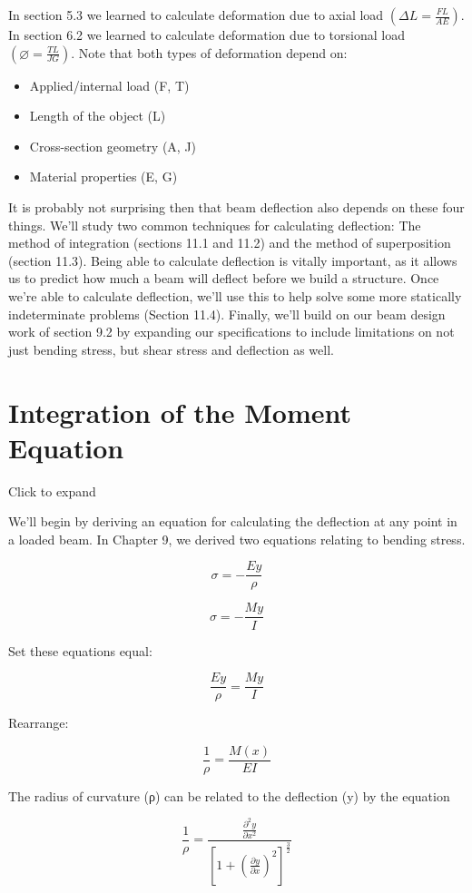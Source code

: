 \documentclass[
  letterpaper,
  DIV=11,
  numbers=noendperiod]{scrreprt}
\begin{document}
In section 5.3 we learned to calculate deformation due to axial load
\(\left(\Delta L=\frac{F L}{A E}\right)\). In section 6.2 we learned to
calculate deformation due to torsional load
\(\left(\varnothing=\frac{T L}{J G}\right)\). Note that both types of
deformation depend on:

\begin{itemize}
\item
  Applied/internal load (F, T)
\item
  Length of the object (L)
\item
  Cross-section geometry (A, J)
\item
  Material properties (E, G)
\end{itemize}

It is probably not surprising then that beam deflection also depends on
these four things. We'll study two common techniques for calculating
deflection: The method of integration (sections 11.1 and 11.2) and the
method of superposition (section 11.3). Being able to calculate
deflection is vitally important, as it allows us to predict how much a
beam will deflect before we build a structure. Once we're able to
calculate deflection, we'll use this to help solve some more statically
indeterminate problems (Section 11.4). Finally, we'll build on our beam
design work of section 9.2 by expanding our specifications to include
limitations on not just bending stress, but shear stress and deflection
as well.

\section{Integration of the Moment Equation}\label{sec-11.1}

Click to expand

We'll begin by deriving an equation for calculating the deflection at
any point in a loaded beam. In Chapter 9, we derived two equations
relating to bending stress.

\[
\sigma=-\frac{E y}{\rho}
\]

\[
\sigma=-\frac{M y}{I}
\]

Set these equations equal:

\[
\frac{E y}{\rho}=\frac{M y}{I}
\]

Rearrange:

\[
\frac{1}{\rho}=\frac{M(x)}{E I}
\]

The radius of curvature (ρ) can be related to the deflection (y) by the
equation

\[
\frac{1}{\rho}=\frac{\frac{\partial^{2} y}{\partial x^{2}}}{\left[1+\left(\frac{\partial y}{\partial x}\right)^{2}\right]^{\frac{3}{2}}}
\]
\end{document}
